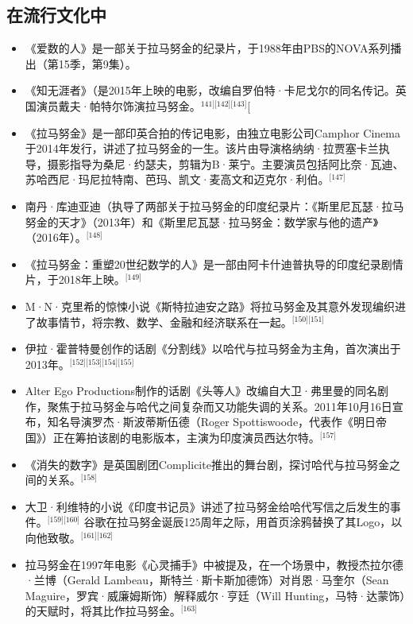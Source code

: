 \subsection{在流行文化中}
\begin{itemize}
\item 《爱数的人》是一部关于拉马努金的纪录片，于1988年由PBS的NOVA系列播出（第15季，第9集）。
\item 《知无涯者》（是2015年上映的电影，改编自罗伯特·卡尼戈尔的同名传记。英国演员戴夫·帕特尔饰演拉马努金。\(^\text{141][142][143]}\)[
\item 《拉马努金》是一部印英合拍的传记电影，由独立电影公司Camphor Cinema于2014年发行，讲述了拉马努金的一生。该片由导演格纳纳·拉贾塞卡兰执导，摄影指导为桑尼·约瑟夫，剪辑为B·莱宁。主要演员包括阿比奈·瓦迪、苏哈西尼·玛尼拉特南、芭玛、凯文·麦高文和迈克尔·利伯。\(^\text{[147]}\)
\item 南丹·库迪亚迪（执导了两部关于拉马努金的印度纪录片：《斯里尼瓦瑟·拉马努金的天才》（2013年）和《斯里尼瓦瑟·拉马努金：数学家与他的遗产》（2016年）。\(^\text{[148]}\)
\item 《拉马努金：重塑20世纪数学的人》是一部由阿卡什迪普执导的印度纪录剧情片，于2018年上映。\(^\text{[149]}\)
\item M·N·克里希的惊悚小说《斯特拉迪安之路》将拉马努金及其意外发现编织进了故事情节，将宗教、数学、金融和经济联系在一起。\(^\text{[150][151]}\)
\item 伊拉·霍普特曼创作的话剧《分割线》以哈代与拉马努金为主角，首次演出于2013年。\(^\text{[152][153][154][155]}\)
\item Alter Ego Productions制作的话剧《头等人》改编自大卫·弗里曼的同名剧作，聚焦于拉马努金与哈代之间复杂而又功能失调的关系。2011年10月16日宣布，知名导演罗杰·斯波蒂斯伍德（Roger Spottiswoode，代表作《明日帝国》）正在筹拍该剧的电影版本，主演为印度演员西达尔特。\(^\text{[157]}\)
\item 《消失的数字》是英国剧团Complicite推出的舞台剧，探讨哈代与拉马努金之间的关系。\(^\text{[158]}\)
\item 大卫·利维特的小说《印度书记员》讲述了拉马努金给哈代写信之后发生的事件。\(^\text{[159][160]}\)
谷歌在拉马努金诞辰125周年之际，用首页涂鸦替换了其Logo，以向他致敬。\(^\text{[161][162]}\)
\item 拉马努金在1997年电影《心灵捕手》中被提及，在一个场景中，教授杰拉尔德·兰博（Gerald Lambeau，斯特兰·斯卡斯加德饰）对肖恩·马奎尔（Sean Maguire，罗宾·威廉姆斯饰）解释威尔·亨廷（Will Hunting，马特·达蒙饰）的天赋时，将其比作拉马努金。\(^\text{[163]}\)
\end{itemize}
